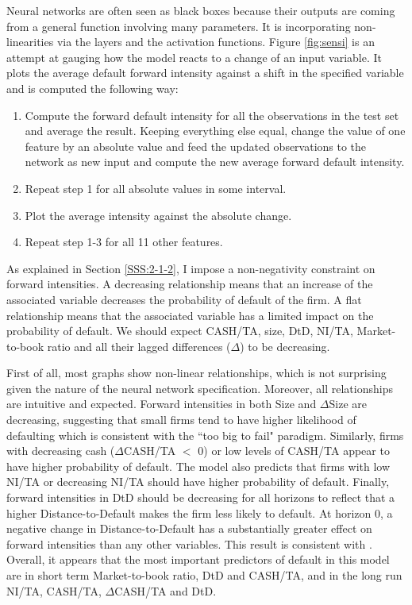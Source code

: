 Neural networks are often seen as black boxes because their outputs are coming from a general function involving many parameters. It is incorporating non-linearities via the layers and the activation functions. Figure \ref{fig:sensi} is an attempt at gauging how the model reacts to a change of an input variable. It plots the average default forward intensity against a shift in the specified variable and is computed the following way:

\begin{enumerate}
    \item Compute the forward default intensity for all the observations in the test set and average the result. Keeping everything else equal, change the value of one feature by an absolute value and feed the updated observations to the network as new input and compute the new average forward default intensity. 
    \item Repeat step 1 for all absolute values in some interval.
    \item Plot the average intensity against the absolute change.
    \item Repeat step 1-3 for all 11 other features.
\end{enumerate}

As explained in Section \ref{SSS:2-1-2}, I impose a non-negativity constraint on forward intensities. A decreasing relationship means that an increase of the associated variable decreases the probability of default of the firm. A flat relationship means that the associated variable has a limited impact on the probability of default. We should expect CASH/TA, size, DtD, NI/TA, Market-to-book ratio and all their lagged differences ($\Delta$) to be decreasing.

First of all, most graphs show non-linear relationships, which is not surprising given the nature of the neural network specification. Moreover, all relationships are intuitive and expected. Forward intensities in both Size and $\Delta$Size are decreasing, suggesting that small firms tend to have higher likelihood of defaulting which is consistent with the ``too big to fail" paradigm. Similarly, firms with decreasing cash ($\Delta$CASH/TA $<$ 0) or low levels of CASH/TA appear to have higher probability of default. The model also predicts that firms with low NI/TA or decreasing NI/TA should have higher probability of default. Finally, forward intensities in DtD should be decreasing for all horizons to reflect that a higher Distance-to-Default makes the firm less likely to default. At horizon 0, a negative change in Distance-to-Default has a substantially greater effect on forward intensities than any other variables. This result is consistent with \cite{DSW}. Overall,
it appears that the most important predictors of default in this model are in short term Market-to-book ratio, DtD and CASH/TA, and in the long run NI/TA, CASH/TA, $\Delta$CASH/TA and DtD.



